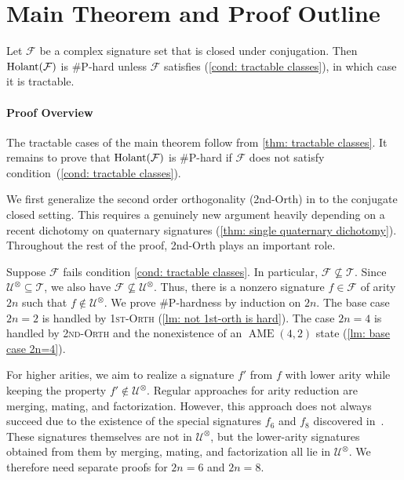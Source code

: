 \section{Main Theorem and Proof Outline}

\begin{theorem}\label{thm: main theorem}
    Let $\mathcal{F}$ be a complex signature set that is closed under conjugation. 
    Then $\operatorname{Holant}(\mathcal{F})$ is \#P-hard unless $\mathcal{F}$ satisfies {\rm (\ref{cond: tractable classes})}, in which case it is tractable.
\end{theorem}

\paragraph{Proof Overview}
The tractable cases of the main theorem follow from \cref{thm: tractable classes}.
It remains to prove that $\operatorname{Holant}(\mathcal{F})$ is \#P-hard if $\mathcal{F}$ does not satisfy condition~(\ref{cond: tractable classes}).

We first generalize the second order orthogonality ({\sc 2nd-Orth}) in \cite{realholant} to the conjugate closed setting.
This requires a genuinely new argument heavily depending on a recent dichotomy on quaternary signatures (\cref{thm: single quaternary dichotomy}).
Throughout the rest of the proof, {\sc 2nd-Orth} plays an important role.

Suppose $\mathcal{F}$ fails condition \eqref{cond: tractable classes}.
In particular, $\mathcal{F}\not\subseteq \mathscr{T}$.
Since $\mathcal{U}^{\otimes}\subseteq \mathscr{T}$, we also have $\mathcal{F}\not\subseteq \mathcal{U}^{\otimes}$.
Thus, there is a nonzero signature $f\in\mathcal{F}$ of arity $2n$ such that $f\notin\mathcal{U}^{\otimes}$.
We prove \#P-hardness by induction on $2n$.
The base case $2n=2$ is handled by \textsc{1st-Orth} (\cref{lm: not 1st-orth is hard}).
The case $2n=4$ is handled by \textsc{2nd-Orth} and the nonexistence of an $\operatorname{AME}(4,2)$ state (\cref{lm: base case 2n=4}).

For higher arities, we aim to realize a signature $f'$ from $f$ with lower arity while keeping the property $f'\notin\mathcal{U}^{\otimes}$.
Regular approaches for arity reduction are merging, mating, and factorization.
However, this approach does not always succeed due to the existence of the special signatures $f_6$ and $f_8$ discovered in~\cite{realholant}.
These signatures themselves are not in $\mathcal{U}^{\otimes}$, but the lower-arity signatures obtained from them by merging, mating, and factorization all lie in $\mathcal{U}^{\otimes}$.
We therefore need separate proofs for $2n=6$ and $2n=8$.

